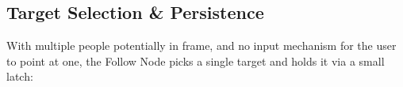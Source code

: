 \subsection{Target Selection \& Persistence}
\label{sec:target_selection}
 
With multiple people potentially in frame, and no input mechanism for the user to point at one, the Follow Node picks a single target and holds it via a small latch:
 

 
 
